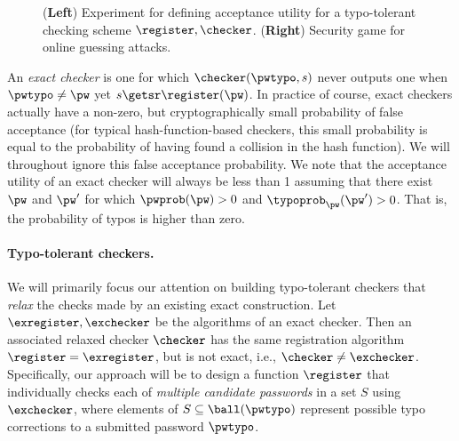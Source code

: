\begin{figure}[t]
\center
{}\hspace{0.1in}
\caption{(\textbf{Left}) Experiment for defining acceptance utility
  for a typo-tolerant checking scheme $\register,\checker$.
  (\textbf{Right}) Security game for online guessing attacks.}
\label{fig:acc-security}
\end{figure}

An \emph{exact checker} is one for which $\checker(\pwtypo,s)$ never outputs one
when $\pwtypo \ne \pw$ yet $s\getsr \register(\pw)$.  In practice of course,
exact checkers actually have a non-zero, but cryptographically small probability
of false acceptance (for typical hash-function-based checkers, this small
probability is equal to the probability of having found a collision in the hash
function).  We will throughout ignore this false acceptance probability.  We
note that the acceptance utility of an exact checker will always be less than 1
assuming that there exist $\pw$ and $\pw'$ for which $\pwprob(\pw) > 0$ and
$\typoprob_\pw(\pw') > 0$. That is, the probability of typos is higher than zero.

\paragraph{Typo-tolerant checkers.} We will primarily focus our 
attention on building typo-tolerant checkers that {\em relax} the checks made by an
existing exact construction. Let $\exregister, \exchecker$ be the algorithms of
an exact checker. Then an associated relaxed checker $\checker$ has the same
registration algorithm $\register = \exregister$, but is not exact, i.e., $\checker \neq \exchecker$.
Specifically, our approach will be to design a function $\register$ that individually checks each of {\em multiple candidate
passwords} in a set $S$ using $\exchecker$, where elements of $S \subseteq \ball(\pwtypo)$ represent possible typo corrections to a submitted password $\pwtypo$.

